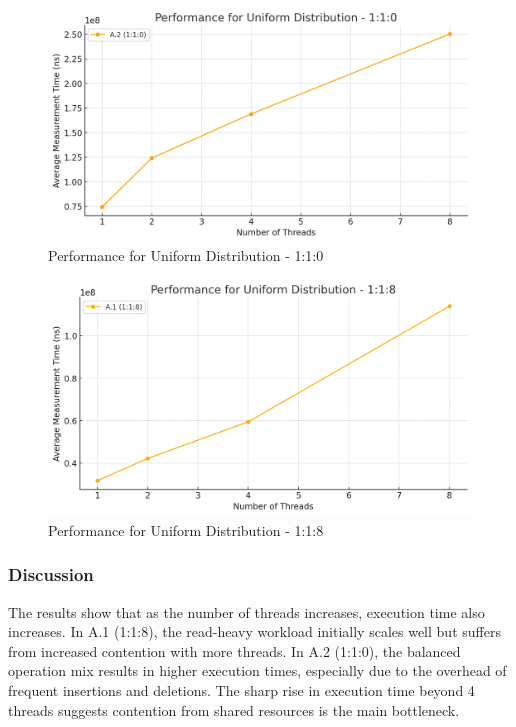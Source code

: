 \documentclass{article}
\begin{document}
\begin{figure}[H]
    \centering
    \includegraphics[width=\textwidth]{LaTex/images/Lab 3 1.2.1.png}
    \caption{Performance for Uniform Distribution - 1:1:0}
    \label{fig:enter-label}
\end{figure}

\begin{figure}[H]
    \centering
    \includegraphics[width=\textwidth]{LaTex/images/Lab 3 1.2.2.png}
    \caption{Performance for Uniform Distribution - 1:1:8}
    \label{fig:enter-label}
\end{figure}

\subsubsection{Discussion}
The results show that as the number of threads increases, execution time also increases. In A.1 (1:1:8), the read-heavy workload initially scales well but suffers from increased contention with more threads. In A.2 (1:1:0), the balanced operation mix results in higher execution times, especially due to the overhead of frequent insertions and deletions. The sharp rise in execution time beyond 4 threads suggests contention from shared resources is the main bottleneck.
\end{document}
